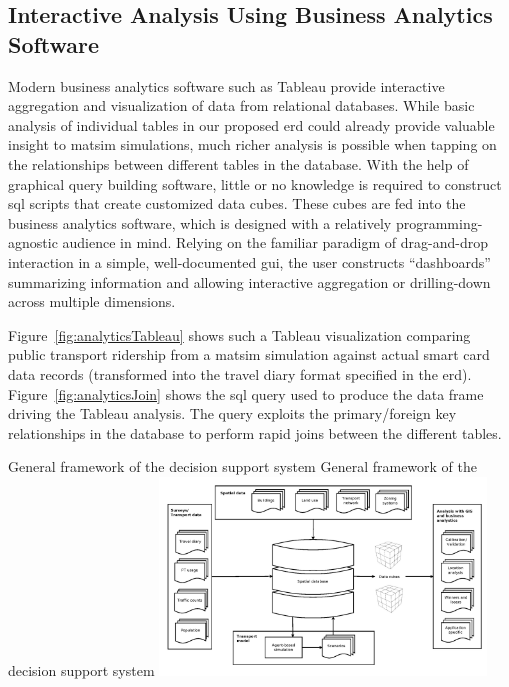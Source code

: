 \subsection{Interactive Analysis Using Business Analytics Software}
Modern business analytics software such as Tableau \citep{Tableau_Webpage_2013} provide interactive aggregation and visualization of data from relational databases. While basic analysis of individual tables in our proposed \gls{erd} could already provide valuable insight to \gls{matsim} simulations, much richer analysis is possible when tapping on the relationships between different tables in the database. With the help of graphical query building software, little or no knowledge is required to construct \gls{sql} scripts that create customized data cubes. These cubes are fed into the business analytics software, which is designed with a relatively programming-agnostic audience in mind. Relying on the familiar paradigm of drag-and-drop interaction in a simple, well-documented \gls{gui}, the user constructs ``dashboards'' summarizing information and allowing interactive aggregation or drilling-down across multiple dimensions.

Figure~\ref{fig:analyticsTableau} shows such a Tableau visualization comparing public transport ridership from a \gls{matsim} simulation against actual smart card data records (transformed into the travel diary format specified in the \gls{erd}). Figure~\ref{fig:analyticsJoin} shows the \gls{sql} query used to produce the data frame driving the Tableau analysis. The query exploits the primary/foreign key relationships in the database to perform rapid joins between the different tables.

\createfigure%
{General framework of the decision support system}%
{General framework of the decision support system}%
{\label{fig:analyticsFramework}}%
{\includegraphics[width=0.65\textwidth, angle=0]{extending/figures/businessanalytics/general}}%
{}

